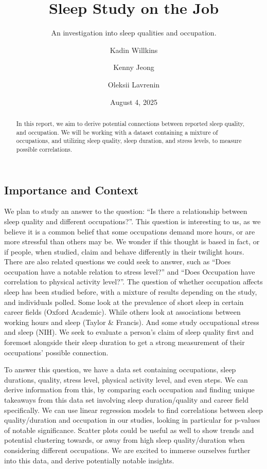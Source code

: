 \documentclass[
  letterpaper,
  DIV=11,
  numbers=noendperiod]{scrartcl}
\title{Sleep Study on the Job}
\subtitle{An investigation into sleep qualities and occupation.}
\author{Kadin Willkins \and Kenny Jeong \and Oleksii Lavrenin}
\date{August 4, 2025}
\begin{document}
\maketitle
\begin{abstract}
In this report, we aim to derive potential connections between reported
sleep quality, and occupation. We will be working with a dataset
containing a mixture of occupations, and utilizing sleep quality, sleep
duration, and stress levels, to measure possible correlations.
\end{abstract}


\subsection{Importance and Context}\label{importance-and-context}

We plan to study an answer to the question: ``Is there a relationship
between sleep quality and different occupations?''. This question is
interesting to us, as we believe it is a common belief that some
occupations demand more hours, or are more stressful than others may be.
We wonder if this thought is based in fact, or if people, when studied,
claim and behave differently in their twilight hours. There are also
related questions we could seek to answer, such as ``Does occupation
have a notable relation to stress level?'' and ``Does Occupation have
correlation to physical activity level?''. The question of whether
occupation affects sleep has been studied before, with a mixture of
results depending on the study, and individuals polled. Some look at the
prevalence of short sleep in certain career fields (Oxford Academic).
While others look at associations between working hours and sleep
(Taylor \& Francis). And some study occupational stress and sleep (NIH).
We seek to evaluate a person's claim of sleep quality first and foremost
alongside their sleep duration to get a strong measurement of their
occupations' possible connection.

To answer this question, we have a data set containing occupations,
sleep durations, quality, stress level, physical activity level, and
even steps. We can derive information from this, by comparing each
occupation and finding unique takeaways from this data set involving
sleep duration/quality and career field specifically. We can use linear
regression models to find correlations between sleep quality/duration
and occupation in our studies, looking in particular for p-values of
notable significance. Scatter plots could be useful as well to show
trends and potential clustering towards, or away from high sleep
quality/duration when considering different occupations. We are excited
to immerse ourselves further into this data, and derive potentially
notable insights.
\end{document}
